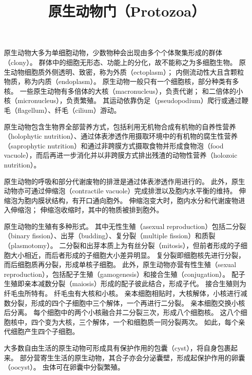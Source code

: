 \documentclass[11pt]{article}
\title{原生动物门（Protozoa）}
\date{}
\begin{document}
  \maketitle

  \linenumbers
原生动物大多为单细胞动物，少数物种会出现由多个个体聚集形成的群体（clony）。
群体中的细胞无形态、功能上的分化，故不能称之为多细胞生物。
原生动物细胞质外侧透明、致密，称为外质（ectoplasm）；
内侧流动性大且含颗粒物质，称为内质（endoplasm）。
原生动物一般只有一个细胞核，部分种类有多核。
一些原生动物有多倍体的大核（macronucleus），负责代谢；
和二倍体的小核（micronucleus），负责繁殖。
其运动依靠伪足（pseudopodium）爬行或通过鞭毛（flagellum）、纤毛（cilium）游动。

\newline

原生动物包含生物界全部营养方式，包括利用无机物合成有机物的自养性营养（holophytic nutrition）、通过体表渗透作用摄取环境中的有机物的腐生性营养（saprophytic nutrition）和通过非跨膜方式摄取食物并形成食物泡（food vacuole），而后再进一步消化并以非跨膜方式排出残渣的动物性营养（holozoic nutrition）。

\newline

原生动物的呼吸和部分代谢废物的排泄是通过体表渗透作用进行的。
此外，原生动物亦可通过伸缩泡（contractile vacuole）完成排泄以及胞内水平衡的维持。
伸缩泡为胞内膜状结构，有开口通向胞外。
伸缩泡变大时，胞内水分和代谢废物进入伸缩泡；
伸缩泡收缩时，其中的物质被排到胞外。

\newline

原生动物的生殖有多种形式。
其中无性生殖（asexual reproduction）包括二分裂（binary fission）、出芽（budding）、复分裂（multiple fission）和质裂（plasmotomy）。
二分裂和出芽本质上为有丝分裂（mitosis），但前者形成的子细胞大小相近，而后者形成的子细胞大小差异明显。
复分裂即细胞核先进行分裂，而后细胞质再分裂，形成单核子细胞。
此外，原生动物亦营有性生殖（sexual reproduction），包括配子生殖（gamogenesis）和接合生殖（conjugation）。
配子生殖即亲本减数分裂（maiosis）形成的配子彼此结合，形成子代。
接合生殖则为纤毛虫所特有。
纤毛虫有大核和小核。
亲本细胞相贴时，大核解体，小核进行减数分裂，形成的四个子细胞中三个解体，一个再进行二分裂。
亲本细胞交换小核后分离。
每个细胞中的两个小核融合并二分裂三次，形成八个细胞核。
这八个细胞核中，四个变为大核，三个解体，一个和细胞质一同分裂两次。
如此，每个亲代细胞产生四个子细胞。

\newline

大多数自由生活的原生动物可形成具有保护作用的包囊（cyst），将自身包裹起来。
部分营寄生生活的原生动物，其合子亦会分泌囊壁，形成起保护作用的卵囊（oocyst）。
虫体可在卵囊中分裂繁殖。
\end{document}
